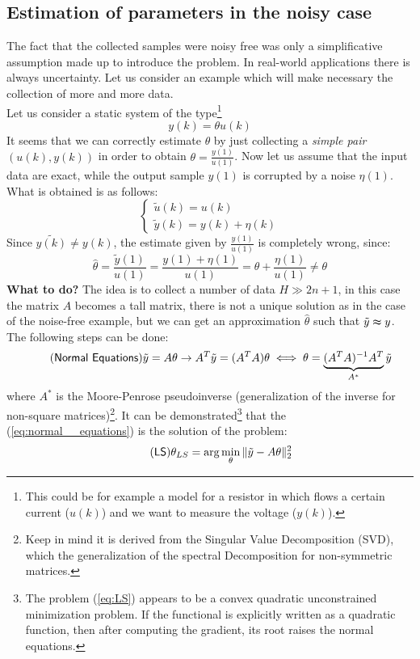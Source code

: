 \subsection{Estimation of parameters in the noisy case}
The fact that the collected samples were noisy free was only a simplificative assumption made up to introduce the problem. In real-world applications there is always uncertainty. Let us consider an example which will make necessary the collection of more and more data.\\
Let us consider a static system of the type\footnote{
    This could be for example a model for a resistor in which flows a certain current ($u(k)$) and we want to measure the voltage ($y(k)$).}
\begin{equation}
    y(k)=\theta{u(k)}
\end{equation}
It seems that we can correctly estimate $\theta$ by just collecting a \textit{simple pair} $(u(k),y(k))$ in order to obtain $\theta=\frac{y(1)}{u(1)}$. Now let us assume that the input data are exact, while the output sample $y(1)$ is corrupted by a noise $\eta(1)$. What is obtained is as follows:
\begin{equation*}
    \begin{cases}
        \tilde{u}(k)=u(k)\\
        \tilde{y}(k)=y(k)+\eta(k)
    \end{cases}
\end{equation*}
Since $\tilde{y(k)}\ne{y(k)}$, the estimate given by $\frac{y(1)}{u(1)}$ is completely wrong, since:
\begin{equation*}
    \hat{\theta}=\frac{\tilde{y}(1)}{u(1)}=\frac{y(1)+\eta(1)}{u(1)}=\theta+\frac{\eta(1)}{u(1)}\ne\theta
\end{equation*}
\textbf{What to do?} The idea is to collect a number of data $H\gg{2n+1}$, in this case the matrix $A$ becomes a tall matrix, there is not a unique solution as in the case of the noise-free example, but we can get an approximation $\hat{\theta}$ such that $\tilde{y}\thickapprox{y}$. The following steps can be done:
\begin{equation}\label{eq:normal__equations} \tag{\textsf{Normal Equations}}
    \tilde{y}={A}\theta \to A^T{\tilde{y}} = (A^T{A})\theta \iff \theta=\underbrace{(A^T{A})^{-1}A^T}_{A^*}{\tilde{y}}
\end{equation}
where $A^*$ is the Moore-Penrose pseudoinverse (generalization of the inverse for non-square matrices)\footnote{
    Keep in mind it is derived from the Singular Value Decomposition (SVD), which the generalization of the spectral Decomposition for non-symmetric matrices.
}. It can be demonstrated\footnote{
    The problem (\ref{eq:LS}) appears to be a convex quadratic unconstrained minimization problem. If the functional is explicitly written as a quadratic function, then after computing the gradient, its root raises the normal equations.
} that the (\ref{eq:normal__equations}) is the solution of the problem:
{\large{
    \color{red}
    \begin{equation} \label{eq:LS} \tag{\textsf{LS}}
        \theta_{LS}=\arg\min_{\theta} \Vert \tilde{y}-A\theta \Vert_2^2
    \end{equation}
}}

